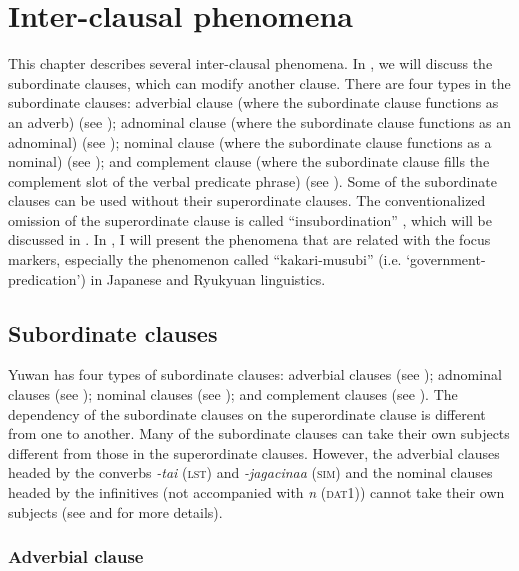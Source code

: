 \chapter{Inter-clausal phenomena}

This chapter describes several inter-clausal phenomena. In , we will discuss the subordinate clauses, which can modify another clause. There are four types in the subordinate clauses: adverbial clause (where the subordinate clause functions as an adverb) (see ); adnominal clause (where the subordinate clause functions as an adnominal) (see ); nominal clause (where the subordinate clause functions as a nominal) (see ); and complement clause (where the subordinate clause fills the complement slot of the verbal predicate phrase) (see ). Some of the subordinate clauses can be used without their superordinate clauses. The conventionalized omission of the superordinate clause is called “insubordination” \citep{Evans2007}, which will be discussed in . In , I will present the phenomena that are related with the focus markers, especially the phenomenon called “kakari-musubi” (i.e. ‘government-predication’) in Japanese and Ryukyuan linguistics.

\section{Subordinate clauses}\label{sec:11.1}

Yuwan has four types of subordinate clauses: adverbial clauses (see ); adnominal clauses (see ); nominal clauses (see ); and complement clauses (see ). The dependency of the subordinate clauses on the superordinate clause is different from one to another. Many of the subordinate clauses can take their own subjects different from those in the superordinate clauses. However, the adverbial clauses headed by the converbs \textit{{}-tai} (\textsc{lst}) and \textit{{}-jagacinaa} (\textsc{sim}) and the nominal clauses headed by the infinitives (not accompanied with \textit{n} (\textsc{dat}1)) cannot take their own subjects (see  and  for more details).

\subsection{Adverbial clause}\label{sec:11.1.1}


